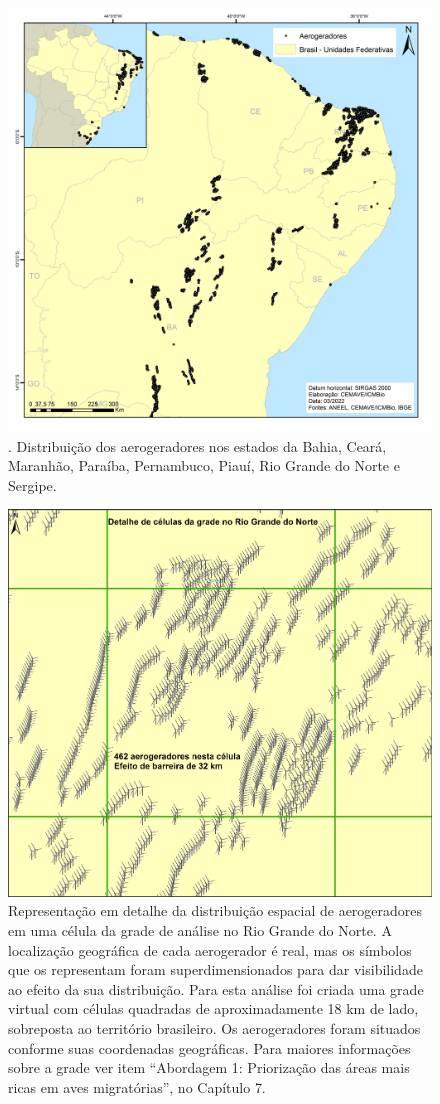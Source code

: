 \documentclass[
  oneside]{scrbook}
\begin{document}
\begin{figure}[H]

{\centering \includegraphics[width=0.75\linewidth]{imagens/cap07/Figura_7.41} 

}

\caption{. Distribuição dos aerogeradores nos estados da Bahia, Ceará, Maranhão, Paraíba, Pernambuco, Piauí, Rio Grande do Norte e Sergipe.}\label{fig:61a}
\end{figure}

\begin{figure}[H]

{\centering \includegraphics[width=0.75\linewidth]{imagens/cap07/Figura_7.42} 

}

\caption{Representação em detalhe da distribuição espacial de aerogeradores em uma célula da grade de análise no Rio Grande do Norte. A localização geográfica de cada aerogerador é real, mas os símbolos que os representam foram superdimensionados para dar visibilidade ao efeito da sua distribuição. Para esta análise foi criada uma grade virtual com células quadradas de aproximadamente 18 km de lado, sobreposta ao território brasileiro. Os aerogeradores foram situados conforme suas coordenadas geográficas. Para maiores informações sobre a grade ver item “Abordagem 1: Priorização das áreas mais ricas em aves migratórias”, no Capítulo 7.}\label{fig:61b}
\end{figure}
\end{document}
